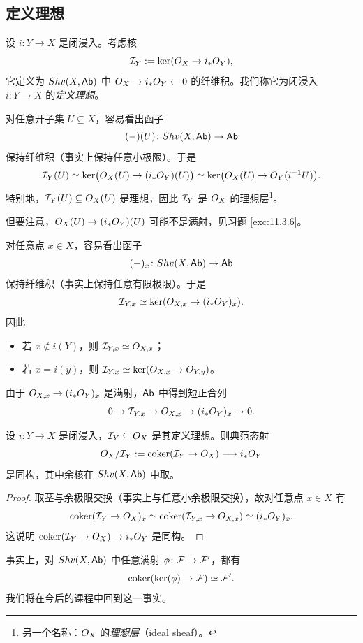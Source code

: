 \subsection{定义理想}\label{sec:11.4}

\begin{construction}\label{con:11.4.1}
设 $i \colon Y \to X$ 是闭浸入。考虑核
\[
\mathcal{I}_Y := \ker(O_X \to i_*O_Y),
\]
它定义为 $Shv(X,\mathsf{Ab})$ 中 $O_X \to i_*O_Y \leftarrow 0$ 的纤维积。我们称它为闭浸入 $i \colon Y \to X$ 的\emph{定义理想}。

对任意开子集 $U \subseteq X$，容易看出函子
\[
(-)(U) \colon Shv(X,\mathsf{Ab}) \to \mathsf{Ab}
\]
保持纤维积（事实上保持任意小极限）。于是
\[
\mathcal{I}_Y(U) \simeq \ker\bigl(O_X(U) \to (i_*O_Y)(U)\bigr) \simeq \ker\bigl(O_X(U) \to O_Y(i^{-1}U)\bigr).
\]
特别地，$\mathcal{I}_Y(U) \subseteq O_X(U)$ 是理想，因此 $\mathcal{I}_Y$ 是 $O_X$ 的理想层\footnote{另一个名称：$O_X$ 的\emph{理想层}（ideal sheaf）。}。

但要注意，$O_X(U) \to (i_*O_Y)(U)$ 可能不是满射，见习题 \ref{exc:11.3.6}。

对任意点 $x \in X$，容易看出函子
\[
(-)_x \colon Shv(X,\mathsf{Ab}) \to \mathsf{Ab}
\]
保持纤维积（事实上保持任意有限极限）。于是
\[
\mathcal{I}_{Y,x} \simeq \ker(O_{X,x} \to (i_*O_Y)_x).
\]
因此
\begin{itemize}[leftmargin=2em,itemsep=0.25ex]
  \item 若 $x \notin i(Y)$，则 $\mathcal{I}_{Y,x} \simeq O_{X,x}$；
  \item 若 $x = i(y)$，则 $\mathcal{I}_{Y,x} \simeq \ker(O_{X,x} \to O_{Y,y})$。
\end{itemize}
由于 $O_{X,x} \to (i_*O_Y)_x$ 是满射，$\mathsf{Ab}$ 中得到短正合列
\[
0 \to \mathcal{I}_{Y,x} \to O_{X,x} \to (i_*O_Y)_x \to 0.
\]
\end{construction}

\begin{lemma}\label{lem:11.4.2}
设 $i \colon Y \to X$ 是闭浸入，$\mathcal{I}_Y \subseteq O_X$ 是其定义理想。则典范态射
\[
O_X/\mathcal{I}_Y := \operatorname{coker}(\mathcal{I}_Y \to O_X) \longrightarrow i_*O_Y
\]
是同构，其中余核在 $Shv(X,\mathsf{Ab})$ 中取。
\end{lemma}

\begin{proof}
取茎与余极限交换（事实上与任意小余极限交换），故对任意点 $x \in X$ 有
\[
\operatorname{coker}(\mathcal{I}_Y \to O_X)_x \simeq \operatorname{coker}(\mathcal{I}_{Y,x} \to O_{X,x}) \simeq (i_*O_Y)_x .
\]
这说明 $\operatorname{coker}(\mathcal{I}_Y \to O_X) \to i_*O_Y$ 是同构。
\end{proof}

\begin{remark}\label{rem:11.4.3}
事实上，对 $Shv(X,\mathsf{Ab})$ 中任意满射 $\phi \colon \mathcal{F} \to \mathcal{F}'$，都有
\[
\operatorname{coker}(\ker(\phi) \to \mathcal{F}) \simeq \mathcal{F}'.
\]
我们将在今后的课程中回到这一事实。
\end{remark}

